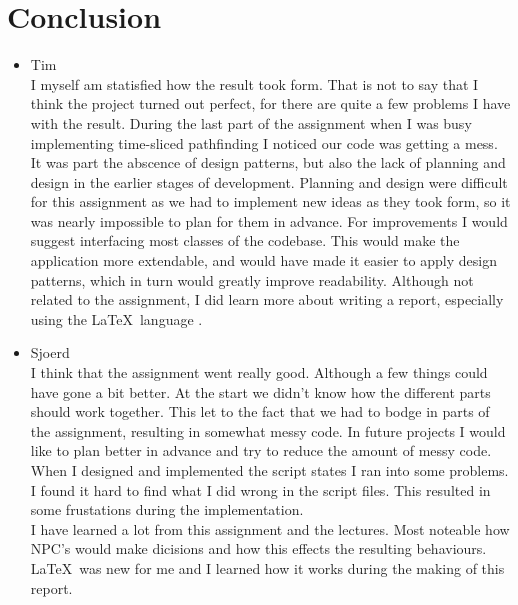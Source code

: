 \documentclass[10pt]{extarticle} %
\begin{document}
   \section {Conclusion}
   \begin{itemize}
   \item Tim\\
	I myself am statisfied how the result took form.
	That is not to say that I think the project turned out perfect, for there are quite a few problems I have with the result.
	During the last part of the assignment when I was busy implementing time-sliced pathfinding I noticed our code was getting a mess.
	It was part the abscence of design patterns, but also the lack of planning and design in the earlier stages of development.
	Planning and design were difficult for this assignment as we had to implement new ideas as they took form, so it was nearly impossible to plan for them in advance.
	For improvements I would suggest interfacing most classes of the codebase. This would make the application more extendable, and would have made it easier to apply design patterns, which in turn would greatly improve readability.
	Although not related to the assignment, I did learn more about writing a report, especially using the \LaTeX\ language \cite{bibmisc}\cite{textut}.
   \item Sjoerd\\
   I think that the assignment went really good. Although a few things could have gone a bit better. At the start we didn't know how the different parts should work together. This let to the fact that we had to bodge in parts of the assignment, resulting in somewhat messy code. In future projects I would like to plan better in advance and try to reduce the amount of messy code.\\
When I designed and implemented the script states I ran into some problems. I found it hard to find what I did wrong in the script files. This resulted in some frustations during the implementation.\\
I have learned a lot from this assignment and the lectures. Most noteable how NPC's would make dicisions and how this effects the resulting behaviours. \LaTeX\ was new for me and I learned how it works during the making of this report. \\

   \end{itemize}

\newpage
 
\end{document}
